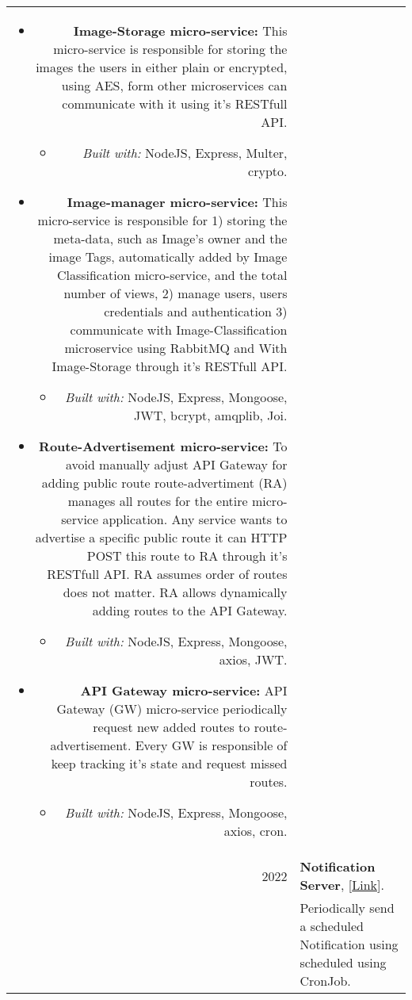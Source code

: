 \documentclass[a4paper,10pt]{article}
\begin{document}
\begin{longtable}{r p{16cm}}
\begin{itemize}
            \item \textbf{Image-Storage micro-service:}
            This micro-service is responsible for storing the images the users in either plain or encrypted, using AES, form other microservices can communicate with it using it's RESTfull API.
            \begin{itemize}
                \item \textit{Built with: } NodeJS, Express, Multer, crypto.
            \end{itemize}

            \item \textbf{Image-manager micro-service:}
            This micro-service is responsible for 1) storing the meta-data, such as Image's owner and the image Tags, automatically added by Image Classification micro-service, and the total number of views, 2) manage users, users credentials and authentication 3) communicate with Image-Classification microservice using RabbitMQ and With Image-Storage through it's RESTfull API.
            \begin{itemize}
                \item \textit{Built with: }NodeJS, Express, Mongoose, JWT, bcrypt, amqplib, Joi.
            \end{itemize}

            \item \textbf{Route-Advertisement micro-service:}
            To avoid manually adjust API Gateway for adding public route route-advertiment (RA) manages all routes for the entire micro-service application. Any service wants to advertise a specific public route it can HTTP POST this route to RA through it's RESTfull API. RA assumes order of routes does not matter. RA allows dynamically adding routes to the API Gateway.
            \begin{itemize}
                \item \textit{Built with: }NodeJS, Express, Mongoose, axios, JWT.
            \end{itemize} 

            \item \textbf{API Gateway micro-service:}
            API Gateway (GW) micro-service periodically request new added routes to route-advertisement. Every GW is responsible of keep tracking it's state and request missed routes.
            \begin{itemize}
                \item \textit{Built with: }NodeJS, Express, Mongoose, axios, cron.
            \end{itemize} 
        \end{itemize}\\

        2022  & \textbf{Notification Server}, [\href{https://github.com/zaky-fetoh/Learning-Backend-Development-Using-NodeJS/tree/main/Day10_NotificationSerWithCronJob}{Link}].\\&
        Periodically send a scheduled Notification using scheduled using CronJob. \\
    \end{longtable}

\label{LastPage}
\end{document}
